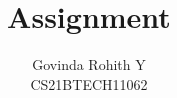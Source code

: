 \documentclass[journal,12pt,twocolumn]{IEEEtran}
\begin{document}
\let\vec\mathbf
\renewcommand{\thefigure}{\theproblem}
\def\putbox#1#2#3{\makebox[0in][l]{\makebox[#1][l]{}\raisebox{\baselineskip}[0in][0in]{\raisebox{#2}[0in][0in]{#3}}}}
     \def\rightbox#1{\makebox[0in][r]{#1}}
     \def\centbox#1{\makebox[0in]{#1}}
     \def\topbox#1{\raisebox{-\baselineskip}[0in][0in]{#1}}
     \def\midbox#1{\raisebox{-0.5\baselineskip}[0in][0in]{#1}}
\title{
	Assignment
}
\author{ Govinda Rohith Y\\CS21BTECH11062%
}	
%
%
%
% 
%
\end{document}
